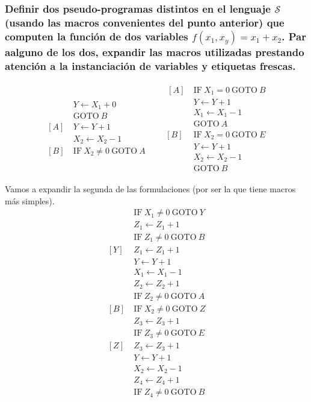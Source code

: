 \documentclass[fleqn, 11pt]{article}
\newcommand{\Scur}{\mathcal{S}}
\newcommand{\into}{\leftarrow}
\newcommand{\IF}{\text{IF}}
\newcommand{\GOTO}{\text{GOTO}}
\begin{document}
\subsubsection{Definir dos pseudo-programas distintos en el lenguaje $\Scur$
(usando las macros convenientes del punto anterior) que computen la función de
dos variables $f(x_1, x_y) = x_1 + x_2$. Par aalguno de los dos, expandir las
macros utilizadas prestando atención a la instanciación de variables y
etiquetas frescas.}

\begin{align*}
	\begin{aligned}
		     &Y   \into X_1 + 0 \\
		     &\GOTO\ B \\
		[A]\ &Y   \into Y   + 1 \\
		     &X_2 \into X_2 - 1 \\
		[B]\ &\IF\ X_2 \neq 0\ \GOTO\ A
	\end{aligned}
	&&
	\begin{aligned}\
		[A]\ &\IF\ X_1 = 0\ \GOTO\ B \\
		     &Y   \into Y   + 1 \\
		     &X_1 \into X_1 - 1 \\
		     &\GOTO\ A \\
		[B]\ &\IF\ X_2 = 0\ \GOTO\ E \\
		     &Y   \into Y   + 1 \\
		     &X_2 \into X_2 - 1 \\
		     &\GOTO\ B
	\end{aligned}
\end{align*}

Vamos a expandir la segunda de las formulaciones (por ser la que tiene macros
más simples).
\begin{align*}
	[A]\ &\IF\ X_1 \neq 0\ \GOTO\ Y \\
	     &Z_1 \into Z_1 + 1 \\
	     &\IF\ Z_1 \neq 0\ \GOTO\ B \\
	[Y]\ &Z_1 \into Z_1 + 1 \\
	     &Y   \into Y   + 1 \\
	     &X_1 \into X_1 - 1 \\
	     &Z_2 \into Z_2 + 1 \\
	     &\IF\ Z_2 \neq 0\ \GOTO\ A \\
	[B]\ &\IF\ X_2 \neq 0\ \GOTO\ Z \\
	     &Z_3 \into Z_3 + 1 \\
	     &\IF\ Z_3 \neq 0\ \GOTO\ E \\
	[Z]\ &Z_3 \into Z_3 + 1 \\
	     &Y   \into Y   + 1 \\
	     &X_2 \into X_2 - 1 \\
	     &Z_4 \into Z_4 + 1 \\
	     &\IF\ Z_4 \neq 0\ \GOTO\ B \\
\end{align*}
\end{document}
